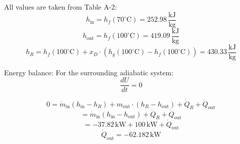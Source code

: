 All values are taken from Table A-2:  
\[
h_{\text{in}} = h_f(70^\circ\text{C}) = 252.98 \, \frac{\text{kJ}}{\text{kg}}
\]  
\[
h_{\text{out}} = h_f(100^\circ\text{C}) = 419.09 \, \frac{\text{kJ}}{\text{kg}}
\]  
\[
h_R = h_f(100^\circ\text{C}) + x_D \cdot \left(h_g(100^\circ\text{C}) - h_f(100^\circ\text{C})\right) = 430.33 \, \frac{\text{kJ}}{\text{kg}}
\]  

Energy balance:  
For the surrounding adiabatic system:  
\[
\frac{dU}{dt} = 0
\]  

\[
0 = \dot{m}_{\text{in}} \left(h_{\text{in}} - h_R\right) + m_{\text{out}} \cdot \left(h_R - h_{\text{out}}\right) + \dot{Q}_R + \dot{Q}_{\text{out}}
\]  
\[
= \dot{m}_{\text{in}} \left(h_{\text{in}} - h_{\text{out}}\right) + \dot{Q}_R + \dot{Q}_{\text{out}}
\]  
\[
= -37.82 \, \text{kW} + 100 \, \text{kW} + \dot{Q}_{\text{out}}
\]  
\[
\dot{Q}_{\text{out}} = -62.182 \, \text{kW}
\]